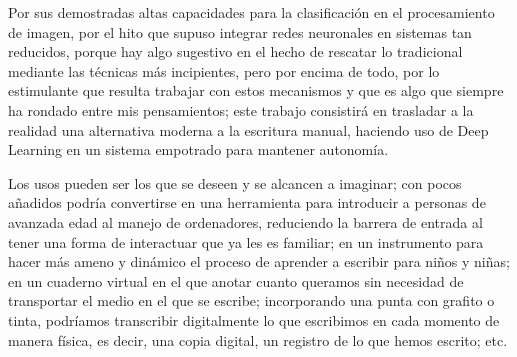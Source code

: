 Por sus demostradas altas capacidades para
la clasificación en el procesamiento de imagen, por el hito
que supuso integrar redes neuronales en sistemas tan reducidos,
porque hay algo sugestivo en el hecho de rescatar lo tradicional
mediante las técnicas más incipientes,
pero por encima de todo, por lo estimulante que resulta trabajar con
estos mecanismos y que es algo que siempre ha rondado entre mis pensamientos;
este trabajo consistirá
en trasladar a la realidad una alternativa moderna a la escritura
manual, haciendo uso de Deep Learning en un sistema empotrado
para mantener autonomía.

Los usos pueden ser los que se deseen y se alcancen a imaginar;
con pocos añadidos podría convertirse en una herramienta para
introducir a personas de avanzada edad al manejo de ordenadores, reduciendo
la barrera de entrada al tener una forma de interactuar que ya les es familiar;
en un instrumento para hacer más ameno y dinámico el proceso de aprender
a escribir para niños y niñas; en un cuaderno virtual en el que anotar cuanto queramos sin necesidad de
transportar el medio en el que se escribe; incorporando una punta
con grafito o tinta, podríamos transcribir digitalmente lo que escribimos
en cada momento de manera física, es decir, una copia digital, un registro
de lo que hemos escrito; etc.

\begin{comment}
Pero por qué no unir ambas experiencias para obtener la sensación de
escritura tradicional y la pretensión pragmática de utilizar nuevas
tecnologías.\\

Es lo que se plantea en este proyecto, un dispositivo que, haciendo
uso de las técnicas más modernas de inteligencia artificial, ayude a
la preservación de la escritura manual; facilitando la inclusión de
la misma en el uso ordinario de los dispositivos electrónicos.\\

Asimismo, en algunos casos sería una forma de incentivar e introducir
a personas poco habituadas al uso de la tecnología, ya que el hecho
de enfrentarse a un nuevo instrumento, puede suponer una barrera
psicológica al empezar para personas de avanzada edad.\newline
Otra posibilidad es enfocarlo como herramienta didáctica, para
que los niños aprendan a escribir de una forma divertida y atractiva.\\ 

Por tanto, el objetivo de este proyecto es desarrollar no solo
un dispositivo autónomo de captación de escritura manual, sino
un entorno completo con la finalidad de diluir la barrera entre
lo tradicional y lo moderno.
\end{comment}